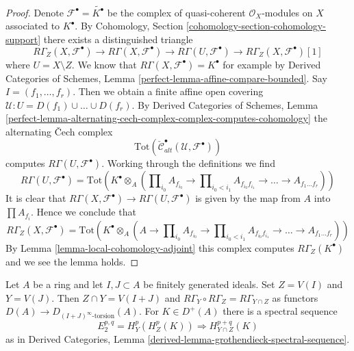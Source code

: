 \begin{proof}
Denote $\mathcal{F}^\bullet = \widetilde{K^\bullet}$ be
the complex of quasi-coherent $\mathcal{O}_X$-modules on $X$
associated to $K^\bullet$.
By Cohomology, Section \ref{cohomology-section-cohomology-support}
there exists a distinguished triangle
$$
R\Gamma_Z(X, \mathcal{F}^\bullet)
\to R\Gamma(X, \mathcal{F}^\bullet)
\to R\Gamma(U, \mathcal{F}^\bullet)
\to R\Gamma_Z(X, \mathcal{F}^\bullet)[1]
$$
where $U = X \setminus Z$. We know that
$R\Gamma(X, \mathcal{F}^\bullet) = K^\bullet$
for example by Derived Categories of Schemes, Lemma
\ref{perfect-lemma-affine-compare-bounded}.
Say $I = (f_1, \ldots, f_r)$. Then we obtain a finite affine
open covering $\mathcal{U} : U = D(f_1) \cup \ldots \cup D(f_r)$.
By Derived Categories of Schemes, Lemma
\ref{perfect-lemma-alternating-cech-complex-complex-computes-cohomology}
the alternating {\v C}ech complex
$$
\text{Tot}(\check{\mathcal{C}}_{alt}^\bullet(\mathcal{U}, \mathcal{F}^\bullet))
$$
computes $R\Gamma(U, \mathcal{F}^\bullet)$. Working through the
definitions we find
$$
R\Gamma(U, \mathcal{F}^\bullet) =
\text{Tot}\left(
K^\bullet \otimes_A
(\prod\nolimits_{i_0} A_{f_{i_0}} \to
\prod\nolimits_{i_0 < i_1} A_{f_{i_0}f_{i_1}} \to
\ldots \to A_{f_1\ldots f_r})\right)
$$
It is clear that
$R\Gamma(X, \mathcal{F}^\bullet) \to R\Gamma(U, \mathcal{F}^\bullet)$
is given by the map from $A$ into $\prod A_{f_i}$. Hence we conclude that
$$
R\Gamma_Z(X, \mathcal{F}^\bullet) =
\text{Tot}\left(
K^\bullet \otimes_A
(A \to \prod\nolimits_{i_0} A_{f_{i_0}} \to
\prod\nolimits_{i_0 < i_1} A_{f_{i_0}f_{i_1}} \to
\ldots \to A_{f_1\ldots f_r})\right)
$$
By Lemma \ref{lemma-local-cohomology-adjoint}
this complex computes $R\Gamma_Z(K^\bullet)$ and we see the lemma holds.
\end{proof}

\begin{lemma}
\label{lemma-local-cohomology-ss}
Let $A$ be a ring and let $I, J \subset A$ be finitely generated
ideals. Set $Z = V(I)$ and $Y = V(J)$. Then $Z \cap Y = V(I + J)$
and $R\Gamma_Y \circ R\Gamma_Z = R\Gamma_{Y \cap Z}$ as functors
$D(A) \to D_{(I + J)^\infty\text{-torsion}}(A)$. For $K \in D^+(A)$
there is a spectral sequence
$$
E_2^{p, q} = H^p_Y(H^p_Z(K)) \Rightarrow H^{p + q}_{Y \cap Z}(K)
$$
as in Derived Categories, Lemma
\ref{derived-lemma-grothendieck-spectral-sequence}.
\end{lemma}

